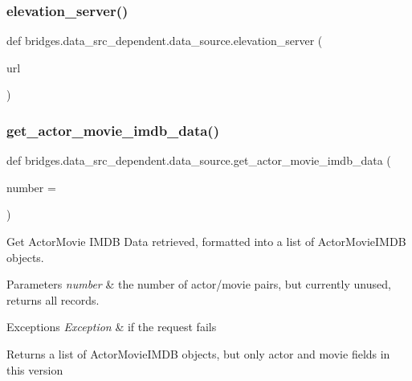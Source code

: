\subsubsection{\texorpdfstring{elevation\_server()}{elevation\_server()}}
{\footnotesize\ttfamily def bridges.\+data\+\_\+src\+\_\+dependent.\+data\+\_\+source.\+elevation\+\_\+server (\begin{DoxyParamCaption}\item[{}]{url }\end{DoxyParamCaption})}

\mbox{\label{namespacebridges_1_1data__src__dependent_1_1data__source_a5a685fd00b37b99d63e706289dad9063}} 
\subsubsection{\texorpdfstring{get\_actor\_movie\_imdb\_data()}{get\_actor\_movie\_imdb\_data()}}
{\footnotesize\ttfamily def bridges.\+data\+\_\+src\+\_\+dependent.\+data\+\_\+source.\+get\+\_\+actor\+\_\+movie\+\_\+imdb\+\_\+data (\begin{DoxyParamCaption}\item[{}]{number = {} }\end{DoxyParamCaption})}



Get Actor\+Movie I\+M\+DB Data retrieved, formatted into a list of Actor\+Movie\+I\+M\+DB objects. 


\begin{DoxyParams}{Parameters}
{\em number} & the number of actor/movie pairs, but currently unused, returns all records. \\
\hline
\end{DoxyParams}

\begin{DoxyExceptions}{Exceptions}
{\em Exception} & if the request fails\\
\hline
\end{DoxyExceptions}
\begin{DoxyReturn}{Returns}
a list of Actor\+Movie\+I\+M\+DB objects, but only actor and movie fields in this version 
\end{DoxyReturn}
\mbox{\label{namespacebridges_1_1data__src__dependent_1_1data__source_a279aa1a757f4838f3d048651cb1a7d26}} 
